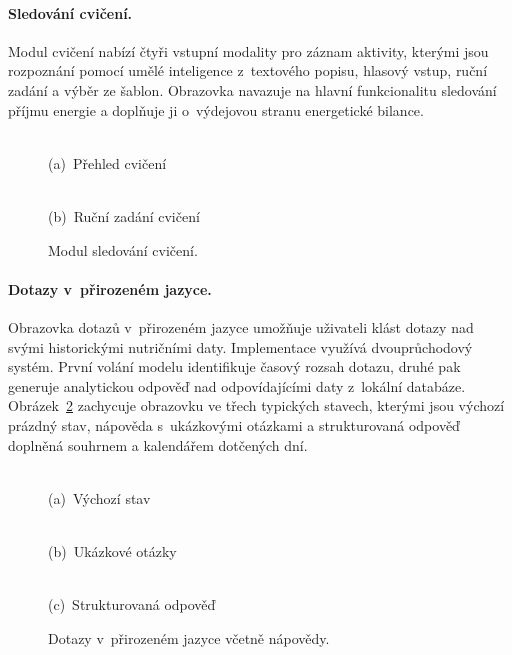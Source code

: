 \paragraph{Sledování cvičení.}
Modul cvičení nabízí čtyři vstupní modality pro záznam aktivity, kterými jsou rozpoznání pomocí umělé inteligence z~textového popisu, hlasový vstup, ruční zadání a výběr ze šablon.
Obrazovka navazuje na hlavní funkcionalitu sledování příjmu energie a doplňuje ji o~výdejovou stranu energetické bilance.

\begin{figure}[!htb]
	\centering
	\begin{minipage}[t]{0.31\textwidth}
		\centering
		\\(a)~Přehled cvičení
	\end{minipage}\hspace{3em}
	\begin{minipage}[t]{0.31\textwidth}
		\centering
		\\(b)~Ruční zadání cvičení
	\end{minipage}
	\caption{Modul sledování cvičení.}
	\label{fig:screenExerciseLog}
\end{figure}

\paragraph{Dotazy v~přirozeném jazyce.}
Obrazovka dotazů v~přirozeném jazyce umožňuje uživateli klást dotazy nad svými historickými nutričními daty.
Implementace využívá dvouprůchodový systém.
První volání modelu identifikuje časový rozsah dotazu, druhé pak generuje analytickou odpověď nad odpovídajícími daty z~lokální databáze.
Obrázek~\ref{fig:screenAskAi} zachycuje obrazovku ve třech typických stavech, kterými jsou výchozí prázdný stav, nápověda s~ukázkovými otázkami a strukturovaná odpověď doplněná souhrnem a kalendářem dotčených dní.

\begin{figure}[!htb]
	\centering
	\begin{minipage}[t]{0.31\textwidth}
		\centering
		\\(a)~Výchozí stav
	\end{minipage}\hfill
	\begin{minipage}[t]{0.31\textwidth}
		\centering
		\\(b)~Ukázkové otázky
	\end{minipage}\hfill
	\begin{minipage}[t]{0.31\textwidth}
		\centering
		\\(c)~Strukturovaná odpověď
	\end{minipage}
	\caption{Dotazy v~přirozeném jazyce včetně nápovědy.}
	\label{fig:screenAskAi}
\end{figure}

